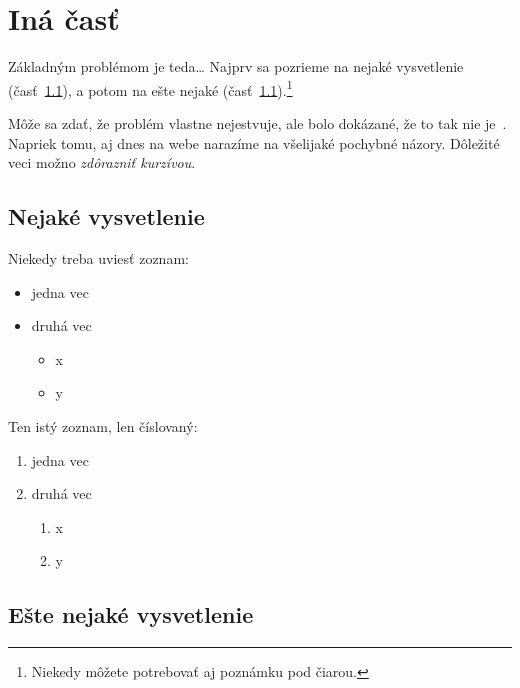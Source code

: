 \documentclass[10pt,twoside,slovak,a4paper]{article}
\begin{document}




\section{Iná časť} \label{ina}

Základným problémom je teda\ldots{} Najprv sa pozrieme na nejaké vysvetlenie (časť~\ref{ina:nejake}), a potom na ešte nejaké (časť~\ref{ina:nejake}).\footnote{Niekedy môžete potrebovať aj poznámku pod čiarou.}

Môže sa zdať, že problém vlastne nejestvuje\cite{Coplien:MPD}, ale bolo dokázané, že to tak nie je~\cite{Czarnecki:Staged, Czarnecki:Progress}. Napriek tomu, aj dnes na webe narazíme na všelijaké pochybné názory\cite{PLP-Framework}. Dôležité veci možno \emph{zdôrazniť kurzívou}.


\subsection{Nejaké vysvetlenie} \label{ina:nejake}

Niekedy treba uviesť zoznam:

\begin{itemize}
\item jedna vec
\item druhá vec
	\begin{itemize}
	\item x
	\item y
	\end{itemize}
\end{itemize}

Ten istý zoznam, len číslovaný:

\begin{enumerate}
\item jedna vec
\item druhá vec
	\begin{enumerate}
	\item x
	\item y
	\end{enumerate}
\end{enumerate}


\subsection{Ešte nejaké vysvetlenie} \label{ina:este}
\end{document}
